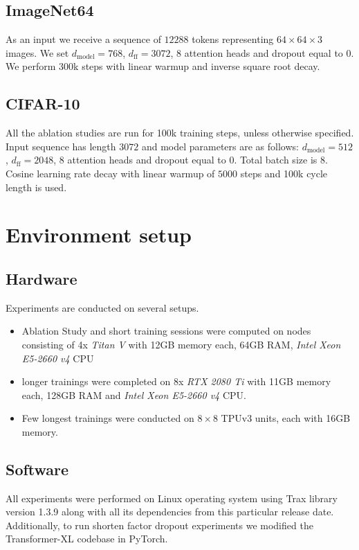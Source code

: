 \documentclass[11pt]{article}
\begin{document}
\subsection{ImageNet64}
As an input we receive a sequence of $12288$ tokens representing $64\times64\times3$ images. We set $d_{\mathrm{model}} = 768$, $d_{\mathrm{ff}} = 3072$, $8$ attention heads and dropout equal to $0$. We perform 300k steps with linear warmup and inverse square root decay.

\subsection{CIFAR-10}
All the ablation studies are run for 100k training steps, unless otherwise specified. Input sequence has length $3072$ and model parameters are as follows: $d_{\mathrm{model}} = 512$, $d_{\mathrm{ff}} = 2048$, $8$ attention heads and dropout equal to $0$. Total batch size is $8$. Cosine learning rate decay with linear warmup of $5000$ steps and 100k cycle length is used.



\section{Environment setup}
\subsection{Hardware}
Experiments are conducted on several setups. 
\begin{itemize}
    \item Ablation Study and short training sessions were computed on nodes consisting of 4x \emph{Titan V} with 12GB memory each, 64GB RAM, \emph{Intel Xeon E5-2660 v4} CPU
    \item longer trainings were completed on 8x \emph{RTX 2080 Ti} with 11GB memory each, 128GB RAM and \emph{Intel Xeon E5-2660 v4} CPU.
    \item Few longest trainings were conducted on $8\times8$ TPUv3 units, each with 16GB memory.
\end{itemize}

\subsection{Software}
All experiments were performed on Linux operating system using Trax library version 1.3.9 along with all its dependencies from this particular release date. Additionally, to run shorten factor dropout experiments we modified the Transformer-XL codebase in PyTorch.
\end{document}

